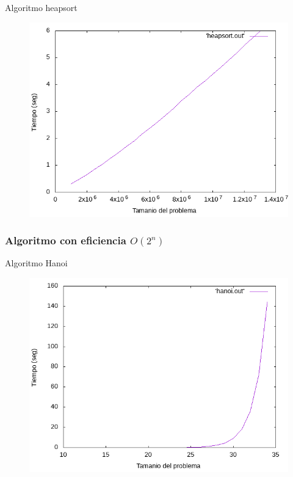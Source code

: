 \documentclass{beamer}
\begin{document}
\begin{frame}[fragile]{Algoritmo heapsort}
\begin{figure}[H]
\centering
\includegraphics[scale=0.5]{empirica_heapsort.png}
\end{figure}
\end{frame}

\subsubsection{Algoritmo con eficiencia $O(2^n)$}

\begin{frame}[fragile]{Algoritmo Hanoi}
\begin{figure}[H]
\centering
\includegraphics[scale=0.5]{empirica_hanoi.png}
\end{figure}
\end{frame}
\end{document}
